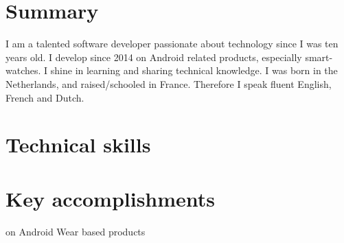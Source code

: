 \documentclass[a4paper,11pt]{moderncv}
\begin{document}
\maketitle

\section{Summary}
I am a talented software developer passionate about technology since I was ten years old.
I develop since 2014 on Android related products, especially smart-watches.
I shine in learning and sharing technical knowledge.
I was born in the Netherlands, and raised/schooled in France. Therefore I speak fluent English, French and Dutch.

\section{Technical skills}
\begin{cvcolumns}
\end{cvcolumns}
    

\section{Key accomplishments}
        {
          on Android Wear based products
        }
\end{document}
